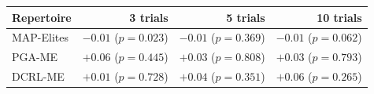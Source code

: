 \begin{tabular}{lrrr}
\toprule
Repertoire & 3 trials & 5 trials & 10 trials \\
\midrule
MAP-Elites & $-0.01$ ($p=0.023$) & $-0.01$ ($p=0.369$) & $-0.01$ ($p=0.062$) \\
PGA-ME & $+0.06$ ($p=0.445$) & $+0.03$ ($p=0.808$) & $+0.03$ ($p=0.793$) \\
DCRL-ME & $+0.01$ ($p=0.728$) & $+0.04$ ($p=0.351$) & $+0.06$ ($p=0.265$) \\
\bottomrule
\end{tabular}
